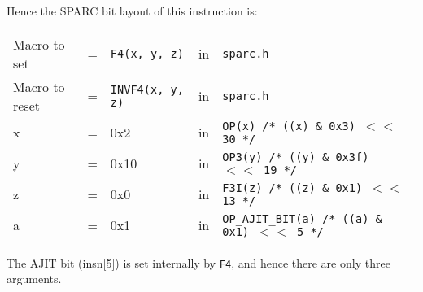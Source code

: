 \begin{enumerate}
  Hence the SPARC bit layout of this instruction is:

  \begin{tabular}[h]{lclcl}
    Macro to set  &=& \texttt{F4(x, y, z)} &in& \texttt{sparc.h}     \\
    Macro to reset  &=& \texttt{INVF4(x, y, z)} &in& \texttt{sparc.h}     \\
    x &=& 0x2      &in& \texttt{OP(x)  /* ((x) \& 0x3)  $<<$ 30 */} \\
    y &=& 0x10     &in& \texttt{OP3(y) /* ((y) \& 0x3f) $<<$ 19 */} \\
    z &=& 0x0      &in& \texttt{F3I(z) /* ((z) \& 0x1)  $<<$ 13 */} \\
    a &=& 0x1      &in& \texttt{OP\_AJIT\_BIT(a) /* ((a) \& 0x1)  $<<$ 5 */}
  \end{tabular}

  The AJIT bit  (insn[5]) is set internally by  \texttt{F4}, and hence
  there are only three arguments.


\end{enumerate}
